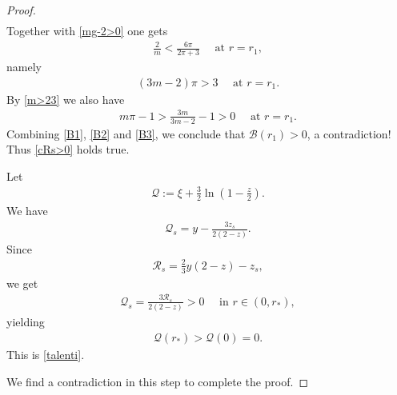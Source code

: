 \documentclass{article}
\theoremstyle{definition} \theoremstyle{remark}
\numberwithin{equation}{section}
\newcommand{\cR}{\mathcal{R}}
\begin{document}
\begin{proof}
\begin{align*}
		\end{align*}
		Together with \eqref{mg-2>0} one gets
		\begin{align*}
			\frac{2}{m} < \frac{6\pi}{2\pi + 3} \quad \text{ at } r = r_1,
		\end{align*}
		namely
		\begin{align} \label{B2}
			(3m - 2)\pi > 3 \quad \text{ at } r = r_1.
		\end{align}
		By \eqref{m>23} we also have
		\begin{align} \label{B3}
			m\pi - 1 > \frac{3m}{3m-2} - 1 > 0 \quad \text{ at } r = r_1.
		\end{align}
		Combining \eqref{B1}, \eqref{B2} and \eqref{B3}, we conclude that $\mathcal{B}(r_1) > 0$, a contradiction! Thus \eqref{cRs>0} holds true.

		Let
		\begin{align*}
			\mathcal{Q} := \xi + \frac{3}{2}\ln\left(1 - \frac{z}{2}\right).
		\end{align*}
		We have
		\begin{align*}
			\mathcal{Q}_s = y - \frac{3z_s}{2(2-z)}.
		\end{align*}
		Since
		\begin{align*}
			\cR_s = \frac{2}{3}y(2-z) - z_s,
		\end{align*}
		we get
		\begin{align*}
			\mathcal{Q}_s = \frac{3\cR_s}{2(2-z)} > 0 \quad \text{ in } r \in (0,r_*),
		\end{align*}
		yielding
		\begin{align*}
			\mathcal{Q}(r_*) > \mathcal{Q}(0) =0.
		\end{align*}
		This is \eqref{talenti}.

\vskip0.12in
 We find a contradiction in this step to complete the proof.


\end{proof}
\end{document}
